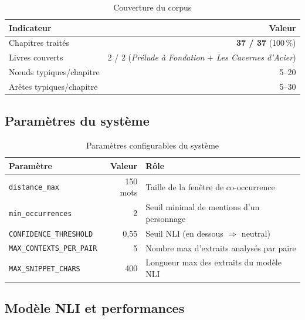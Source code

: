 \documentclass[a4paper,11pt]{article}
\begin{document}
\begin{table}[H]
  \centering
  \small
  \begin{tabular}{lr}
    \toprule
    \textbf{Indicateur} & \textbf{Valeur} \\
    \midrule
    Chapitres traités         & \textbf{37 / 37} (100\,\%) \\
    Livres couverts           & 2 / 2 (\textit{Prélude à Fondation} + \textit{Les Cavernes d'Acier}) \\
    Nœuds typiques/chapitre   & 5--20 \\
    Arêtes typiques/chapitre  & 5--30 \\
    \bottomrule
  \end{tabular}
  \caption{Couverture du corpus}
\end{table}

\subsection{Paramètres du système}

\begin{table}[H]
  \centering
  \small
  \begin{tabular}{lrl}
    \toprule
    \textbf{Paramètre} & \textbf{Valeur} & \textbf{Rôle} \\
    \midrule
    \texttt{distance\_max}          & 150 mots & Taille de la fenêtre de co-occurrence \\
    \texttt{min\_occurrences}       & 2        & Seuil minimal de mentions d'un personnage \\
    \texttt{CONFIDENCE\_THRESHOLD}  & 0{,}55   & Seuil NLI (en dessous $\Rightarrow$ neutral) \\
    \texttt{MAX\_CONTEXTS\_PER\_PAIR} & 5      & Nombre max d'extraits analysés par paire \\
    \texttt{MAX\_SNIPPET\_CHARS}    & 400      & Longueur max des extraits du modèle NLI \\
    \bottomrule
  \end{tabular}
  \caption{Paramètres configurables du système}
\end{table}

\subsection{Modèle NLI et performances}
\end{document}
